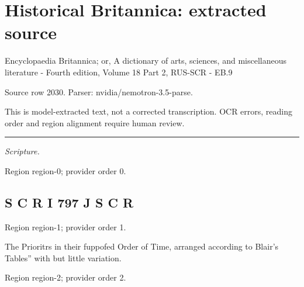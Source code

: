 \documentclass[11pt]{article}
\begin{document}
\section*{Historical Britannica: extracted source}
Encyclopaedia Britannica; or, A dictionary of arts, sciences, and miscellaneous literature - Fourth edition, Volume 18 Part 2, RUS-SCR - EB.9\par
{\small Source row 2030. Parser: nvidia/nemotron-3.5-parse.\par}
{\small This is model-extracted text, not a corrected transcription. OCR errors, reading order and region alignment require human review.\par}
\hrule\medskip
{\small\itshape Scripture.\par}

{\scriptsize\color{gray} Region region-0; provider order 0.\par}
\medskip

\subsection*{S C R I 797 J S C R}

{\scriptsize\color{gray} Region region-1; provider order 1.\par}
\medskip

The Prioritrs in their fuppofed Order of Time, arranged according to Blair’s Tables” with but little variation.
\par

{\scriptsize\color{gray} Region region-2; provider order 2.\par}
\medskip
\end{document}
